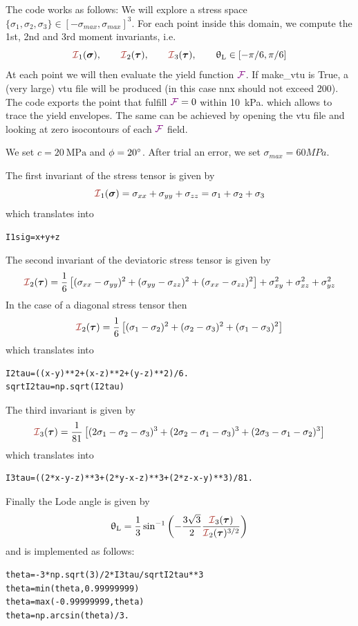 The code works as follows: We will explore a stress 
space $\{\sigma_1,\sigma_2,\sigma_3\}\in[-\sigma_{max},\sigma_{max}]^3$.
For each point inside this domain, we compute the 1st, 2nd and 3rd moment invariants, i.e.
\[
\III_1({\bm \sigma}), 
\qquad \III_2({\bm \tau}), 
\qquad \III_3({\bm \tau}), 
\qquad \uptheta_{\rm L}\in[-\pi/6,\pi/6]
\] 
At each point we will then evaluate the yield function ${\color{violet}\cal F}$. 
If {\python make\_vtu} is True, a (very large) vtu file will be produced (in this 
case nnx should not exceed 200).
The code exports the point that fulfill ${\color{violet}\cal F}=0$ within 10~\si{\kilo\pascal}. 
which allows to trace the yield envelopes.
The same can be achieved by opening the vtu file and looking at zero isocontours of each ${\color{violet}\cal F}$ field.

We set $c=20~\si{\mega\pascal}$ and $\phi=20\degree$. After trial an error, we set $\sigma_{max}=60MPa$.

The first invariant of the stress tensor is given by 
\[
\III_1({\bm\sigma})=\sigma_{xx}+\sigma_{yy}+\sigma_{zz} = \sigma_1+\sigma_2+\sigma_3
\]
which translates into
\begin{lstlisting}
I1sig=x+y+z
\end{lstlisting}
The second invariant of the deviatoric stress tensor is given by 
\[
\III_2({\bm \tau})  
=\frac{1}{6}\left[(\sigma_{xx}-\sigma_{yy})^2 + (\sigma_{yy}-\sigma_{zz})^2 + (\sigma_{xx}-\sigma_{zz})^2 \right]  
+ \sigma_{xy}^2 + \sigma_{xz}^2 + \sigma_{yz}^2 
\]
In the case of a diagonal stress tensor then
\[
\III_2({\bm \tau})  
=\frac{1}{6}\left[(\sigma_{1}-\sigma_{2})^2 + (\sigma_{2}-\sigma_{3})^2 + (\sigma_{1}-\sigma_{3})^2 \right]  
\]
which translates into
\begin{lstlisting}
I2tau=((x-y)**2+(x-z)**2+(y-z)**2)/6.
sqrtI2tau=np.sqrt(I2tau)
\end{lstlisting}

The third invariant is given by
\[
\III_3(\bm \tau)
= \frac{1}{81}
\left[
(2\sigma_1-\sigma_2-\sigma_3)^3+
(2\sigma_2-\sigma_1-\sigma_3)^3+
(2\sigma_3-\sigma_1-\sigma_2)^3
\right] 
\]
which translates into
\begin{lstlisting}
I3tau=((2*x-y-z)**3+(2*y-x-z)**3+(2*z-x-y)**3)/81.
\end{lstlisting}

Finally the Lode angle is given by
\[
\uptheta_{\rm L} = 
\frac{1}{3} \sin^{-1} 
\left( -\frac{3\sqrt{3}}{2} \frac{{\III}_3({\bm \tau})}{{\III}_2({\bm \tau})^{3/2}} \right)
\]
and is implemented as follows:
\begin{lstlisting}
theta=-3*np.sqrt(3)/2*I3tau/sqrtI2tau**3
theta=min(theta,0.99999999)
theta=max(-0.99999999,theta)
theta=np.arcsin(theta)/3.
\end{lstlisting}


